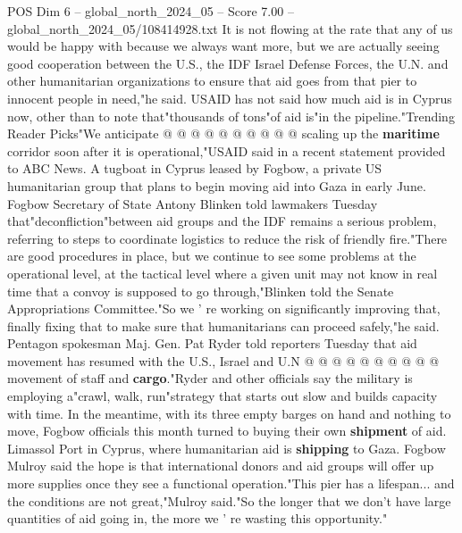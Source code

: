 \begin{textsample}{POS Dim 6 – global\_north\_2024\_05 – Score 7.00 – global\_north\_2024\_05/108414928.txt}
It is not flowing at the rate that any of us would be happy with because we always want more, but we are actually seeing good cooperation between the U.S., the IDF Israel Defense Forces, the U.N. and other humanitarian organizations to ensure that aid goes from that pier to innocent people in need,"he said.
USAID has not said how much aid is in Cyprus now, other than to note that"thousands of tons"of aid is"in the pipeline."Trending Reader Picks"We anticipate @ @ @ @ @ @ @ @ @ @ scaling up the \textbf{maritime} corridor soon after it is operational,"USAID said in a recent statement provided to ABC News.
A tugboat in Cyprus leased by Fogbow, a private US humanitarian group that plans to begin moving aid into Gaza in early June.
Fogbow Secretary of State Antony Blinken told lawmakers Tuesday that"deconfliction"between aid groups and the IDF remains a serious problem, referring to steps to coordinate logistics to reduce the risk of friendly fire."There are good procedures in place, but we continue to see some problems at the operational level, at the tactical level where a given unit may not know in real time that a convoy is supposed to go through,"Blinken told the Senate Appropriations Committee."So we ' re working on significantly improving that, finally fixing that to make sure that humanitarians can proceed safely,"he said.
Pentagon spokesman Maj.
Gen.
Pat Ryder told reporters Tuesday that aid movement has resumed with the U.S., Israel and U.N @ @ @ @ @ @ @ @ @ @ movement of staff and \textbf{cargo}."Ryder and other officials say the military is employing a"crawl, walk, run"strategy that starts out slow and builds capacity with time.
In the meantime, with its three empty barges on hand and nothing to move, Fogbow officials this month turned to buying their own \textbf{shipment} of aid.
Limassol Port in Cyprus, where humanitarian aid is \textbf{shipping} to Gaza.
Fogbow Mulroy said the hope is that international donors and aid groups will offer up more supplies once they see a functional operation."This pier has a lifespan... and the conditions are not great,"Mulroy said."So the longer that we don't have large quantities of aid going in, the more we ' re wasting this opportunity."

\end{textsample}
